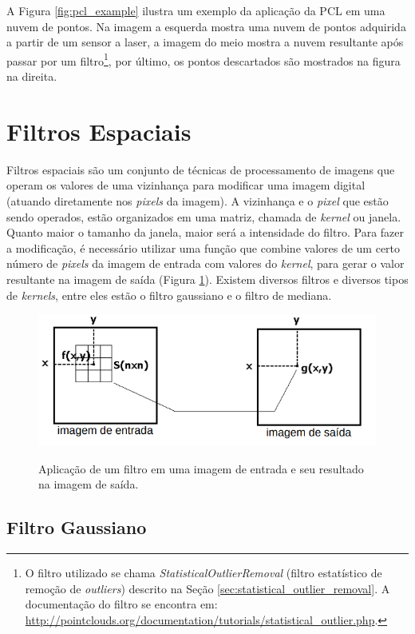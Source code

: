 A Figura \ref{fig:pcl_example} ilustra um exemplo da aplicação da PCL em uma nuvem de pontos. Na imagem a esquerda mostra uma nuvem de pontos adquirida a partir de um sensor a laser, a imagem do meio mostra a nuvem resultante após passar por um filtro\footnote{O filtro utilizado se chama \textit{StatisticalOutlierRemoval} (filtro estatístico de remoção de \textit{outliers}) descrito na Seção \ref{sec:statistical_outlier_removal}. A documentação do filtro se encontra em: \url{http://pointclouds.org/documentation/tutorials/statistical_outlier.php}.}, por último, os pontos descartados são mostrados na figura na direita.

\section{Filtros Espaciais}
Filtros espaciais são um conjunto de técnicas de processamento de imagens que operam os valores de uma vizinhança para modificar uma imagem digital (atuando diretamente nos \textit{pixels} da imagem). 
A vizinhança e o \textit{pixel} que estão sendo operados, estão organizados em uma matriz, chamada de \textit{kernel} ou janela. 
Quanto maior o tamanho da janela, maior será a intensidade do filtro.
Para fazer a modificação, é necessário utilizar uma função que combine valores de um certo número de \textit{pixels} da imagem de entrada com valores do \textit{kernel}, para gerar o valor resultante na imagem de saída (Figura \ref{fig:image_filter}).
Existem diversos filtros e diversos tipos de \textit{kernels}, entre eles estão o filtro gaussiano e o filtro de mediana.

\begin{figure}[H]
    \centering
    \caption{Aplicação de um filtro em uma imagem de entrada e seu resultado na imagem de saída.}
    \includegraphics[scale=0.4]{dados/figuras/image_filters.png}
    \label{fig:image_filter}
\end{figure}


\subsection{Filtro Gaussiano}
\label{sec:gaussian_filter}

